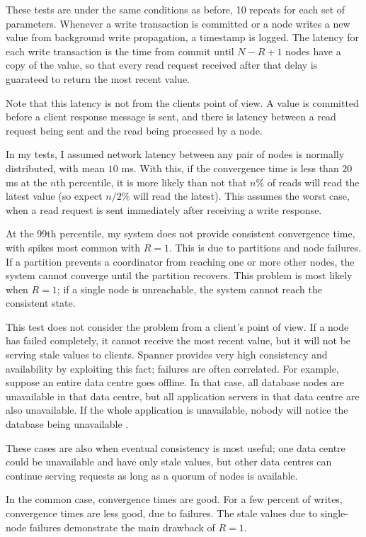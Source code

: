 \documentclass[12pt,a4paper,twoside,openany]{report}
\begin{document}
These tests are under the same conditions as before, 10 repeats for each set of parameters. Whenever a write transaction is committed or a node writes a new value from background write propagation, a timestamp is logged. The latency for each write transaction is the time from commit until $N - R + 1$ nodes have a copy of the value, so that every read request received after that delay is guarateed to return the most recent value.

Note that this latency is not from the clients point of view. A value is committed before a client response message is sent, and there is latency between a read request being sent and the read being processed by a node.

In my tests, I assumed network latency between any pair of nodes is normally distributed, with mean $10$ ms. With this, if the convergence time is less than $20$ ms at the $n$th percentile, it is more likely than not that $n\%$ of reads will read the latest value (so expect $n / 2 \%$ will read the latest). This assumes the worst case, when a read request is sent immediately after receiving a write response.

At the 99th percentile, my system does not provide consistent convergence time, with spikes most common with $R = 1$. This is due to partitions and node failures. If a partition prevents a coordinator from reaching one or more other nodes, the system cannot converge until the partition recovers. This problem is most likely when $R = 1$; if a single node is unreachable, the system cannot reach the consistent state.

This test does not consider the problem from a client's point of view. If a node has failed completely, it cannot receive the most recent value, but it will not be serving stale values to clients. Spanner provides very high consistency and availability by exploiting this fact; failures are often correlated. For example, suppose an entire data centre goes offline. In that case, all database nodes are unavailable in that data centre, but all application servers in that data centre are also unavailable. If the whole application is unavailable, nobody will notice the database being unavailable \cite{45855}.

These cases are also when eventual consistency is most useful; one data centre could be unavailable and have only stale values, but other data centres can continue serving requests as long as a quorum of nodes is available.

In the common case, convergence times are good. For a few percent of writes, convergence times are less good, due to failures. The stale values due to single-node failures demonstrate the main drawback of $R = 1$.
\end{document}
